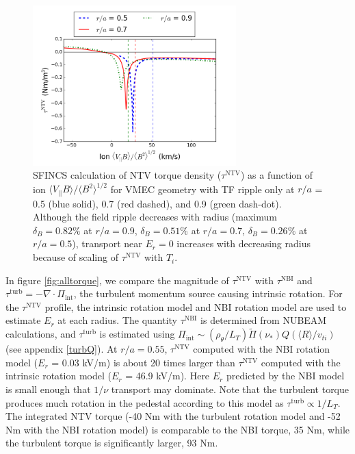 \documentclass[aip, pop, preprint]{revtex4-1}
\numberwithin{figure}{section}
\numberwithin{equation}{section}
\begin{document}
\begin{figure}[h!]
\centering
\includegraphics[width=0.7\textwidth]
{Torque_radiusscaling.png}
\caption{\label{fig:Torque_radiusscaling} SFINCS calculation of NTV torque density ($\tau^{\text{NTV}}$) as a function of ion $\langle V_{||} B \rangle/\langle B^2 \rangle^{1/2}$ for VMEC geometry with TF ripple only at $r/a$ = 0.5 (blue solid), 0.7 (red dashed), and 0.9 (green dash-dot). Although the field ripple decreases with radius (maximum $\delta_B = 0.82\%$ at $r/a = 0.9$, $\delta_B = 0.51\%$ at $r/a = 0.7$, $\delta_B = 0.26\%$ at $r/a = 0.5$), transport near $E_r = 0$ increases with decreasing radius because of scaling of $\tau^{\text{NTV}}$ with $T_i$.\cite{Stringer1972,Shaing2003}}
\end{figure}

In figure \ref{fig:alltorque}, we compare the magnitude of $\tau^{\text{NTV}}$ with $\tau^{\text{NBI}}$ and $\tau^{\text{turb}} = -\nabla \cdot \Pi_{\text{int}}$, the turbulent momentum source causing intrinsic rotation. For the $\tau^{\text{NTV}}$ profile, the intrinsic rotation model and NBI rotation model are used to estimate $E_r$ at each radius. The quantity $\tau^{\text{NBI}}$ is determined from NUBEAM calculations,\cite{Poli2014} and $\tau^{\text{turb}}$ is estimated using $\Pi_{\text{int}} \sim (\rho_{\theta}/L_T) \widetilde{\Pi}(\nu_*) Q (\langle R \rangle/v_{ti})$ (see appendix \ref{turbQ}). At $r/a = 0.55$, $\tau^{\text{NTV}}$ computed with the NBI rotation model ($E_r$ = 0.03 kV/m) is about 20 times larger than $\tau^{\text{NTV}}$ computed with the intrinsic rotation model ($E_r$ = 46.9 kV/m). Here $E_r$ predicted by the NBI model is small enough that $1/\nu$ transport may dominate. Note that the turbulent torque produces much rotation in the pedestal according to this model as $\tau^{\text{turb}} \propto 1/L_T$. The integrated NTV torque (-40 Nm with the turbulent rotation model and -52 Nm with the NBI rotation model) is comparable to the NBI torque, 35 Nm, while the turbulent torque is significantly larger, 93 Nm. 
\end{document}
